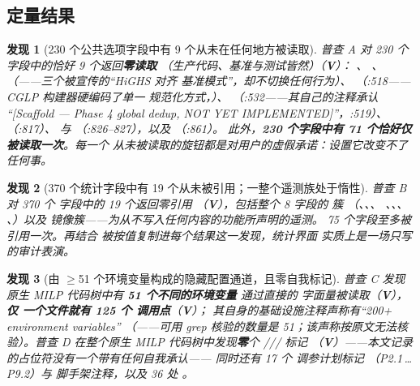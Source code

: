 \documentclass[11pt]{ctexart}
\newtheorem{finding}{发现}
\begin{document}
\subsection{定量结果}
\begin{finding}[230 个公共选项字段中有 9 个从未在任何地方被读取]
\label{find:dead-options}
普查 A 对 230 个字段中的恰好 9 个返回\textbf{零读取}
（生产代码、基准与测试皆然）（\textbf{V}）：
、
、
（——三个被宣传的“HiGHS 对齐
基准模式”，却不切换任何行为）、
（:518——CGLP 构建器硬编码了单一
规范化方式，）、
（:532——其自己的注释承认
\emph{“[Scaffold --- Phase 4 global dedup, NOT YET IMPLEMENTED]”}，:519）、
（:817）、
 与
（:826--827），以及
（:861）。
此外，\textbf{230 个字段中有 71 个恰好仅被读取一次}。每一个
从未被读取的旋钮都是对用户的虚假承诺：设置它改变不了任何事。
\end{finding}

\begin{finding}[370 个统计字段中有 19 个从未被引用；一整个遥测族处于惰性]
\label{find:dead-stats}
普查 B 对 370 个  字段中的 19 个返回零引用
（\textbf{V}），包括整个 8 字段的  簇
（、、、
、、、
、）以及 
镜像簇——为从不写入任何内容的功能所声明的遥测。
75 个字段至多被引用一次。再结合
 被按值复制进每个结果这一发现，统计界面
实质上是一场只写的审计表演。
\end{finding}

\begin{finding}[由 $\ge$51 个环境变量构成的隐藏配置通道，且零自我标记]
\label{find:env-vars}
普查 C 发现原生 MILP 代码树中有 \textbf{51 个不同的环境变量}
通过直接的  字面量被读取（\textbf{V}），
\textbf{仅  一个文件就有 125 个  调用点}（\textbf{V}）；
其自身的基础设施注释声称有“200+ environment variables”
（——可用 grep 核验的数量是
51；该声称按原文无法核验）。普查 D 在整个原生
MILP 代码树中发现\textbf{零}个
/// 标记
（\textbf{V}）——本文记录的占位符没有一个带有任何自我承认——
同时还有 17 个  调参计划标记
（P2.1\,\dots\,P9.2）与  脚手架注释，以及
36 处 。
\end{finding}
\end{document}
